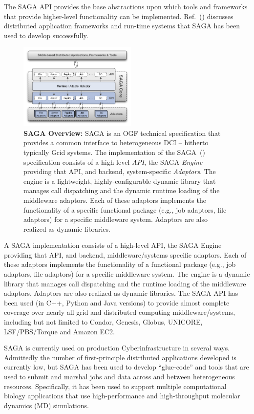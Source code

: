 \documentclass{sig-alternate}
\begin{document}
The SAGA API provides the base abstractions upon which tools and
frameworks that provide higher-level functionality can be
implemented. Ref.~(\cite{saga_url}) discusses distributed application
frameworks and run-time systems that SAGA has been used to develop
successfully. 

\begin{figure}[t]
\centering
\includegraphics[width=0.52\textwidth]{./figs/saga-architecture-1}
\caption{\textbf{SAGA Overview: } SAGA is an OGF technical
  specification that provides a common interface to heterogeneous DCI
  -- hitherto typically Grid systems.  The implementation of the
  SAGA~(\cite{saga_url}) specification consists of a high-level {\it
    API}, the SAGA {\it Engine} providing that API, and backend,
  system-specific {\it Adaptors}.  The engine is a lightweight,
  highly-configurable dynamic library that manages call dispatching
  and the dynamic runtime loading of the middleware adaptors.  Each of
  these adaptors implements the functionality of a specific functional
  package (e.g., job adaptors, file adaptors) for a specific
  middleware system. Adaptors are also realized as dynamic libraries.}
 \label{fig:saga-overview}
\end{figure}

A SAGA implementation consists of a high-level API, the SAGA
Engine providing that API, and backend, middleware/systems specific
adaptors. Each of these adaptors implements the functionality of
a functional package (e.g., job adaptors, file adaptors) for a
specific middleware system. The engine is a dynamic library that
manages call dispatching and the runtime loading of the middleware
adaptors. Adaptors are also realized as dynamic libraries. The SAGA
API has been used (in C++, Python and Java versions) to provide almost
complete coverage over nearly all grid and distributed computing
middleware/systems, including but not limited to Condor, Genesis,
Globus, UNICORE, LSF/PBS/Torque and Amazon EC2.

SAGA is currently used on production Cyberinfrastructure in several
ways. Admittedly the number of first-principle distributed
applications developed is currently low, but SAGA has been used to develop
``glue-code'' and tools that are used to submit and marshal jobs and
data across and between heterogeneous resources. Specifically, it has
been used to support multiple computational biology applications that
use high-performance and high-throughput molecular dynamics (MD)
simulations.
\end{document}
